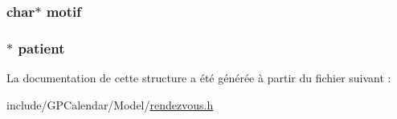 \hypertarget{struct_rendez_vous_ac1d72cddca5f2d79a6b2691aacd03850}{
\subsubsection[{motif}]{\setlength{\rightskip}{0pt plus 5cm}char$\ast$ motif}}\label{struct_rendez_vous_ac1d72cddca5f2d79a6b2691aacd03850}
\hypertarget{struct_rendez_vous_a602d93e6dfbb9a54fc31419f2463ac2b}{
\subsubsection[{patient}]{$\ast$ patient}}\label{struct_rendez_vous_a602d93e6dfbb9a54fc31419f2463ac2b}


La documentation de cette structure a été générée à partir du fichier suivant \-:\begin{DoxyCompactItemize}
\item 
include/\-G\-P\-Calendar/\-Model/\hyperlink{rendezvous_8h}{rendezvous.\-h}\end{DoxyCompactItemize}
